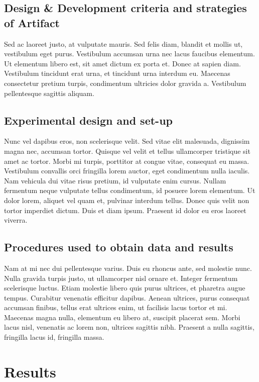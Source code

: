 \documentclass[12pt, a4paper,twoside]{tesi_upf}
\begin{document}
\section{Design \& Development criteria and strategies of Artifact}

Sed ac laoreet justo, at vulputate mauris. Sed felis diam, blandit et mollis ut, vestibulum eget purus. Vestibulum accumsan urna nec lacus faucibus elementum. Ut elementum libero est, sit amet dictum ex porta et. Donec at sapien diam. Vestibulum tincidunt erat urna, et tincidunt urna interdum eu. Maecenas consectetur pretium turpis, condimentum ultricies dolor gravida a. Vestibulum pellentesque sagittis aliquam.

\section{Experimental design and set-up}

Nunc vel dapibus eros, non scelerisque velit. Sed vitae elit malesuada, dignissim magna nec, accumsan tortor. Quisque vel velit et tellus ullamcorper tristique sit amet ac tortor. Morbi mi turpis, porttitor at congue vitae, consequat eu massa. Vestibulum convallis orci fringilla lorem auctor, eget condimentum nulla iaculis. Nam vehicula dui vitae risus pretium, id vulputate enim cursus. Nullam fermentum neque vulputate tellus condimentum, id posuere lorem elementum. Ut dolor lorem, aliquet vel quam et, pulvinar interdum tellus. Donec quis velit non tortor imperdiet dictum. Duis et diam ipsum. Praesent id dolor eu eros laoreet viverra.

\section{Procedures used to obtain data and results}

Nam at mi nec dui pellentesque varius. Duis eu rhoncus ante, sed molestie nunc. Nulla gravida turpis justo, ut ullamcorper nisl ornare et. Integer fermentum scelerisque luctus. Etiam molestie libero quis purus ultrices, et pharetra augue tempus. Curabitur venenatis efficitur dapibus. Aenean ultrices, purus consequat accumsan finibus, tellus erat ultrices enim, ut facilisis lacus tortor et mi. Maecenas magna nulla, elementum eu libero at, suscipit placerat sem. Morbi lacus nisl, venenatis ac lorem non, ultrices sagittis nibh. Praesent a nulla sagittis, fringilla lacus id, fringilla massa.

\chapter{Results}
\end{document}
